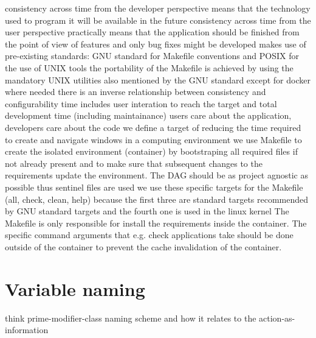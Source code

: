 \documentclass[journal]{IEEEtran}
\begin{document}
consistency across time from the developer perspective means that the technology used to program it will be available in the future
consistency across time from the user perspective practically means that the application should be finished from the point of view of features and only bug fixes might be developed
makes use of pre-existing standards: GNU standard for Makefile conventions and POSIX for the use of UNIX tools
the portability of the Makefile is achieved by using the mandatory UNIX utilities also mentioned by the GNU standard except for docker where needed
there is an inverse relationship between consistency and configurability
time includes user interation to reach the target and total development time (including maintainance)
users care about the application, developers care about the code
we define a target of reducing the time required to create and navigate windows in a computing environment
we use Makefile to create the isolated environment (container) by bootstraping all required files if not already present and to make sure that subsequent changes to the requirements update the environment. The DAG should be as project agnostic as possible thus sentinel files are used
we use these specific targets for the Makefile (all, check, clean, help) because the first three are standard targets recommended by GNU standard targets and the fourth one is used in the linux kernel
The Makefile is only responsible for install the requirements inside the container.
The specific command arguments that e.g. check applications take should be done outside of the container to prevent the cache invalidation of the container.

\section{Variable naming}
think prime-modifier-class naming scheme and how it relates to the action-as-information
\end{document}
